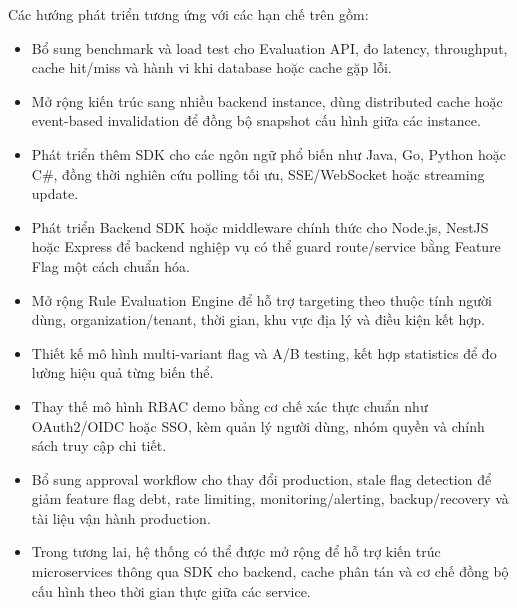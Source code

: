 Các hướng phát triển tương ứng với các hạn chế trên gồm:

\begin{itemize}
    \item Bổ sung benchmark và load test cho Evaluation API, đo latency, throughput, cache hit/miss và hành vi khi database hoặc cache gặp lỗi.
    \item Mở rộng kiến trúc sang nhiều backend instance, dùng distributed cache hoặc event-based invalidation để đồng bộ snapshot cấu hình giữa các instance.
    \item Phát triển thêm SDK cho các ngôn ngữ phổ biến như Java, Go, Python hoặc C\#, đồng thời nghiên cứu polling tối ưu, SSE/WebSocket hoặc streaming update.
    \item Phát triển Backend SDK hoặc middleware chính thức cho Node.js, NestJS hoặc Express để backend nghiệp vụ có thể guard route/service bằng Feature Flag một cách chuẩn hóa.
    \item Mở rộng Rule Evaluation Engine để hỗ trợ targeting theo thuộc tính người dùng, organization/tenant, thời gian, khu vực địa lý và điều kiện kết hợp.
    \item Thiết kế mô hình multi-variant flag và A/B testing, kết hợp statistics để đo lường hiệu quả từng biến thể.
    \item Thay thế mô hình RBAC demo bằng cơ chế xác thực chuẩn như OAuth2/OIDC hoặc SSO, kèm quản lý người dùng, nhóm quyền và chính sách truy cập chi tiết.
    \item Bổ sung approval workflow cho thay đổi production, stale flag detection để giảm feature flag debt, rate limiting, monitoring/alerting, backup/recovery và tài liệu vận hành production.
    \item Trong tương lai, hệ thống có thể được mở rộng để hỗ trợ kiến trúc microservices thông qua SDK cho backend, cache phân tán và cơ chế đồng bộ cấu hình theo thời gian thực giữa các service.
\end{itemize}
